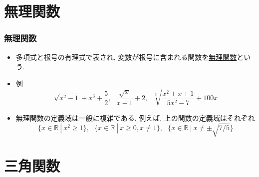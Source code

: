 \documentclass[dvipdfmx,cjk,10.2pt]{beamer}
\newcommand{\R}{\mathbb{R}}
\theoremstyle{definition}
\begin{document}


\section{無理関数}

\begin{frame}
\frametitle{無理関数}

\begin{itemize}
\item 
多項式と根号の有理式で表され, 変数が根号に含まれる関数を\underline{無理関数}という. 
\item 例
$$
\sqrt{x^2-1}+x^3+\frac{5}{2}, \ \ \ \frac{\sqrt{x}}{x-1}+2, \ \ \ \sqrt[3]{\frac{x^2+x+1}{5x^2-7}}+100x
$$
\item 無理関数の定義域は一般に複雑である. 例えば, 上の関数の定義域はそれぞれ
$$
\{x \in \R \ | \ x^2 \ge 1\}, \ \ \ \{x \in \R \ | \ x \ge 0, x \neq 1\}, \ \ \ \{x \in \R \ | \ x \neq \pm \sqrt{7/5}\}
$$
\end{itemize}

\end{frame}



\section{三角関数}
\end{document}
